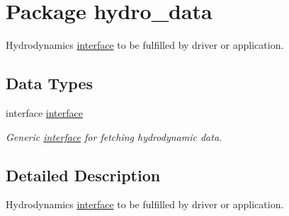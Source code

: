 \hypertarget{a00060}{
\section{Package hydro\_\-data}
\label{a00060}
}
Hydrodynamics \hyperlink{a00004}{interface} to be fulfilled by driver or application.  


\subsection*{Data Types}
\begin{CompactItemize}
\item 
interface \hyperlink{a00004}{interface}
\begin{CompactList}\small\item\em Generic \hyperlink{a00004}{interface} for fetching hydrodynamic data. \item\end{CompactList}\end{CompactItemize}


\subsection{Detailed Description}
Hydrodynamics \hyperlink{a00004}{interface} to be fulfilled by driver or application. 


